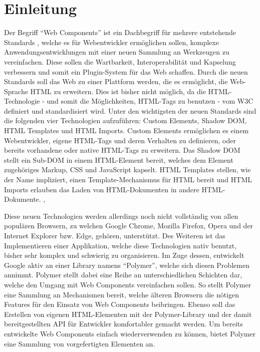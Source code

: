 \chapter{Einleitung}\label{einleitung}

Der Begriff ``Web Components'' ist ein Dachbegriff für mehrere entstehende Standards \cite{citeulike:13844988}, welche es für Webentwickler ermöglichen sollen, komplexe Anwendungsentwicklungen mit einer neuen Sammlung an Werkzeugen zu vereinfachen. Diese sollen die Wartbarkeit, Interoperabilität und Kapselung verbessern und somit ein Plugin-System für das Web schaffen. Durch die neuen Standards soll das Web zu einer Plattform werden, die es ermöglicht, die Web-Sprache \ac{HTML} zu erweitern. Dies ist bisher nicht möglich, da die \ac{HTML}-Technologie - und somit die Möglichkeiten, \ac{HTML}-Tags zu benutzen - vom \ac{W3C} definiert und standardisiert wird. Unter den wichtigsten der neuen Standards sind die folgenden vier Technologien aufzuführen: Custom Elements, Shadow \ac{DOM}, \ac{HTML} Templates und \ac{HTML} Imports. Custom Elements ermöglichen es einem Webentwickler, eigene \ac{HTML}-Tags und deren Verhalten zu definieren, oder bereits vorhandene oder native \ac{HTML}-Tags zu erweitern. Das Shadow \ac{DOM} stellt ein Sub-\ac{DOM} in einem \ac{HTML}-Element bereit, welches dem Element zugehöriges Markup, \ac{CSS} und JavaScript kapselt. \ac{HTML} Templates stellen, wie der Name impliziert, einen Template-Mechanismus für \ac{HTML} bereit und \ac{HTML} Imports erlauben das Laden von \ac{HTML}-Dokumenten in andere \ac{HTML}-Dokumente. \cite{citeulike:13842702}, \cite{citeulike:13842701}

Diese neuen Technologien werden allerdings noch nicht vollständig von allen populären Browsern, zu welchen Google Chrome, Mozilla Firefox, Opera und der Internet Explorer bzw. Edge, gehören, unterstützt. Des Weiteren ist das Implementieren einer Applikation, welche diese Technologien nativ benutzt, bisher sehr komplex und schwierig zu organisieren. Im Zuge dessen, entwickelt Google aktiv an einer Library namens ``Polymer'', welche sich diesen Problemen annimmt. Polymer stellt dabei eine Reihe an unterschiedlichen Schichten dar, welche den Umgang mit Web Components vereinfachen sollen. So stellt Polymer eine Sammlung an Mechanismen bereit, welche älteren Browsern die nötigen Features für den Einsatz von Web Components beibringen. Ebenso soll das Erstellen von eigenen \ac{HTML}-Elementen mit der Polymer-Library und der damit bereitgestellten \ac{API} für Entwickler komfortabler gemacht werden. Um bereits entwickelte Web Components einfach wiederverwenden zu können, bietet Polymer eine Sammlung von vorgefertigten Elementen an.

